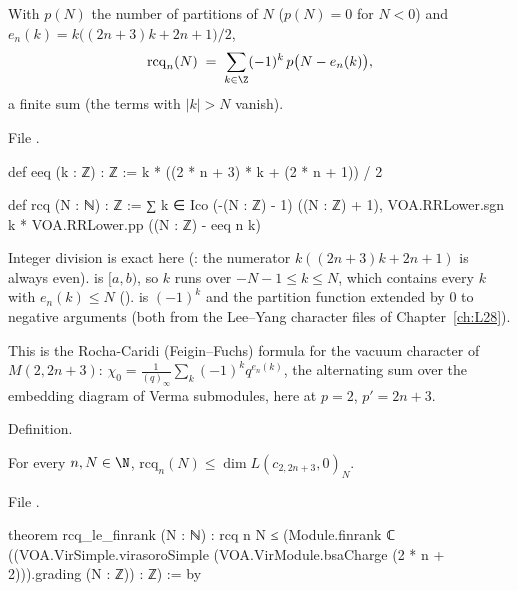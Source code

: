 \begin{definition}\label{l29:def:rcq}
With $p(N)$ the number of partitions of $N$ ($p(N)=0$ for $N<0$) and $e_n(k)=k\bigl((2n+3)k+2n+1\bigr)/2$,
\begin{equation*}
\mathrm{rcq}_n(N)\;=\;\sum_{k\in\Z}(-1)^k\,p\bigl(N-e_n(k)\bigr),
\end{equation*}
a finite sum (the terms with $|k|>N$ vanish).
\end{definition}

\noindent File .
\begin{leancode}
def eeq (k : ℤ) : ℤ := k * ((2 * n + 3) * k + (2 * n + 1)) / 2

def rcq (N : ℕ) : ℤ := ∑ k ∈ Ico (-(N : ℤ) - 1) ((N : ℤ) + 1), VOA.RRLower.sgn k * VOA.RRLower.pp ((N : ℤ) - eeq n k)
\end{leancode}

\begin{dictionary}
Integer division  is exact here (: the numerator $k((2n+3)k+2n+1)$ is always even).
 is $[a,b)$, so $k$ runs over $-N-1\le k\le N$, which contains every $k$ with $e_n(k)\le N$
().  is $(-1)^k$ and  the partition function extended by
$0$ to negative arguments (both from the Lee--Yang character files of Chapter~\ref{ch:L28}).
\end{dictionary}

\begin{physics}
This is the Rocha-Caridi (Feigin--Fuchs) formula for the vacuum character of $M(2,2n+3)$:
$\chi_0=\frac{1}{(q)_\infty}\sum_k(-1)^kq^{e_n(k)}$, the alternating sum over the embedding diagram of Verma
submodules, here at $p=2$, $p'=2n+3$.
\end{physics}

\begin{status}
Definition.
\end{status}

\begin{theorem}\label{l29:thm:rcq}
For every $n,N\in\N$, $\mathrm{rcq}_n(N)\le\dim L(c_{2,2n+3},0)_N$.
\end{theorem}

\noindent File .
\begin{leancode}
theorem rcq_le_finrank (N : ℕ) :
    rcq n N ≤ (Module.finrank ℂ ((VOA.VirSimple.virasoroSimple
      (VOA.VirModule.bsaCharge (2 * n + 2))).grading (N : ℤ)) : ℤ) := by
\end{leancode}

